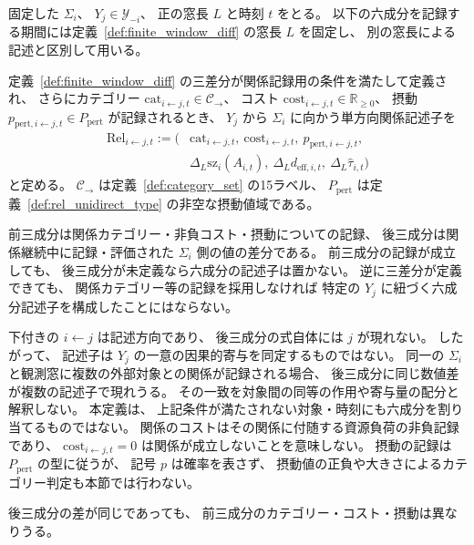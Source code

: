 \begin{definition}
\label{def:rel_unidirect}
固定した $\Sigma_i$、
$Y_j\in\mathcal Y_{-i}$、
正の窓長 $L$ と時刻 $t$ をとる。
以下の六成分を記録する期間には定義~\ref{def:finite_window_diff} の窓長 $L$ を固定し、
別の窓長による記述と区別して用いる。

定義~\ref{def:finite_window_diff} の三差分が関係記録用の条件を満たして定義され、
さらにカテゴリー $\mathrm{cat}_{i\leftarrow j,t}\in\mathcal C_{\rightarrow}$、
コスト $\mathrm{cost}_{i\leftarrow j,t}\in\mathbb R_{\geq0}$、
摂動 $p_{\mathrm{pert},i\leftarrow j,t}\in P_{\mathrm{pert}}$ が記録されるとき、
$Y_j$ から $\Sigma_i$ に向かう単方向関係記述子を
\[
\begin{aligned}
 \mathrm{Rel}_{i\leftarrow j,t}:=\bigl(&
 \mathrm{cat}_{i\leftarrow j,t},\ \mathrm{cost}_{i\leftarrow j,t},\
 p_{\mathrm{pert},i\leftarrow j,t},\\
 &\Delta_L\mathrm{sz}_i(A_{i,t}),\
 \Delta_Ld_{\mathrm{eff},i,t},\
 \Delta_L\widehat\tau_{i,t}\bigr)
\end{aligned}
\]
と定める。
$\mathcal C_{\rightarrow}$ は定義~\ref{def:category_set} の15ラベル、
$P_{\mathrm{pert}}$ は定義~\ref{def:rel_unidirect_type} の非空な摂動値域である。

前三成分は関係カテゴリー・非負コスト・摂動についての記録、
後三成分は関係継続中に記録・評価された $\Sigma_i$ 側の値の差分である。
前三成分の記録が成立しても、
後三成分が未定義なら六成分の記述子は置かない。
逆に三差分が定義できても、
関係カテゴリー等の記録を採用しなければ
特定の $Y_j$ に紐づく六成分記述子を構成したことにはならない。

下付きの $i\leftarrow j$ は記述方向であり、
後三成分の式自体には $j$ が現れない。
したがって、
記述子は $Y_j$ の一意の因果的寄与を同定するものではない。
同一の $\Sigma_i$ と観測窓に複数の外部対象との関係が記録される場合、
後三成分に同じ数値差が複数の記述子で現れうる。
その一致を対象間の同等の作用や寄与量の配分と解釈しない。
本定義は、
上記条件が満たされない対象・時刻にも六成分を割り当てるものではない。
関係のコストはその関係に付随する資源負荷の非負記録であり、
$\mathrm{cost}_{i\leftarrow j,t}=0$ は関係が成立しないことを意味しない。
摂動の記録は $P_{\mathrm{pert}}$ の型に従うが、
記号 $p$ は確率を表さず、
摂動値の正負や大きさによるカテゴリー判定も本節では行わない。

後三成分の差が同じであっても、
前三成分のカテゴリー・コスト・摂動は異なりうる。
\end{definition}

